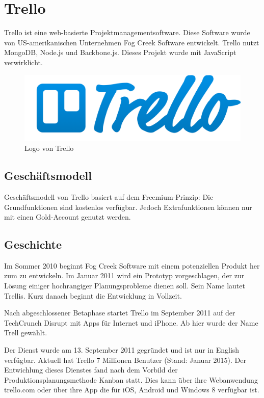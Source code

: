 \section{Trello}
Trello ist eine web-basierte Projektmanagementsoftware. Diese Software wurde von US-amerikanischen Unternehmen Fog Creek Software entwickelt. Trello nutzt MongoDB, Node.js und Backbone.js. Dieses Projekt wurde mit JavaScript verwirklicht.

\begin{figure}[h]
  \centering
    \includegraphics[width=\textwidth]{trello.png}
  \caption{Logo von Trello}
  \label{fig:trello}
\end{figure}
\subsection{Geschäftsmodell}
Geschäftsmodell von Trello basiert auf dem Freemium-Prinzip: Die Grundfunktionen sind kostenlos verfügbar. Jedoch Extrafunktionen können nur mit einen Gold-Account genutzt werden.
\subsection{Geschichte}
Im Sommer 2010 beginnt Fog Creek Software mit einem potenziellen Produkt her zum zu entwickeln. Im Januar 2011 wird ein Prototyp vorgeschlagen, der zur Lösung einiger hochrangiger Planungsprobleme dienen soll. Sein Name lautet Trellis. Kurz danach beginnt die Entwicklung in Vollzeit.

Nach abgeschlossener Betaphase startet Trello im September 2011 auf der TechCrunch Disrupt mit Apps für Internet und iPhone. Ab hier wurde der Name Trell gewählt.

Der Dienst wurde am 13. September 2011 gegründet und ist nur in English verfügbar. Aktuell hat Trello 7 Millionen Benutzer (Stand: Januar 2015). Der Entwichlung dieses Dienstes fand nach dem Vorbild der Produktionsplanungsmethode Kanban statt. Dies kann über ihre Webanwendung trello.com oder über ihre App die für iOS, Android und Windows 8 verfügbar ist.

